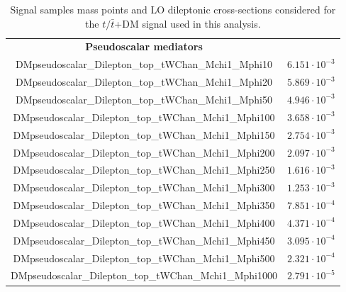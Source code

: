 \documentclass[a4paper, 10pt, openright]{report}
\begin{document}
\begin{appendices}
\begin{table}
\begin{center}
\begin{tabular}{ c|c }
 \hline
 \textbf{Pseudoscalar mediators} & \\
 DMpseudoscalar\_Dilepton\_top\_tWChan\_Mchi1\_Mphi10 & $6.151 \cdot 10^{-3}$ \\
 DMpseudoscalar\_Dilepton\_top\_tWChan\_Mchi1\_Mphi20 & $5.869 \cdot 10^{-3}$ \\
 DMpseudoscalar\_Dilepton\_top\_tWChan\_Mchi1\_Mphi50 & $4.946 \cdot 10^{-3}$ \\
 DMpseudoscalar\_Dilepton\_top\_tWChan\_Mchi1\_Mphi100 & $3.658 \cdot 10^{-3}$ \\
 DMpseudoscalar\_Dilepton\_top\_tWChan\_Mchi1\_Mphi150 & $2.754 \cdot 10^{-3}$ \\
 DMpseudoscalar\_Dilepton\_top\_tWChan\_Mchi1\_Mphi200 & $2.097 \cdot 10^{-3}$ \\
 DMpseudoscalar\_Dilepton\_top\_tWChan\_Mchi1\_Mphi250 & $1.616 \cdot 10^{-3}$ \\
 DMpseudoscalar\_Dilepton\_top\_tWChan\_Mchi1\_Mphi300 & $1.253 \cdot 10^{-3}$ \\
 DMpseudoscalar\_Dilepton\_top\_tWChan\_Mchi1\_Mphi350 & $7.851 \cdot 10^{-4}$ \\
 DMpseudoscalar\_Dilepton\_top\_tWChan\_Mchi1\_Mphi400 & $4.371 \cdot 10^{-4}$ \\
 DMpseudoscalar\_Dilepton\_top\_tWChan\_Mchi1\_Mphi450 & $3.095 \cdot 10^{-4}$ \\
 DMpseudoscalar\_Dilepton\_top\_tWChan\_Mchi1\_Mphi500 & $2.321 \cdot 10^{-4}$ \\
 DMpseudoscalar\_Dilepton\_top\_tWChan\_Mchi1\_Mphi1000 & $2.791 \cdot 10^{-5}$ \\
 \hline
\end{tabular}
\caption{Signal samples mass points and \ac{LO} dileptonic cross-sections considered for the $t/ \bar t$+DM signal used in this analysis.}
\label{table:tDMsignals}
\end{center}
\end{table}


\end{appendices}
\end{document}
